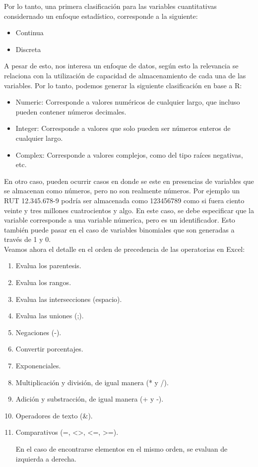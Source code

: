 \documentclass[12 pt,letterpaper]{article}
\begin{document}
Por lo tanto, una primera clasificación para las variables cuantitativas considernado un enfoque estadístico, corresponde a la siguiente: 

\begin{itemize}
	\item Continua
	\item Discreta
\end{itemize}

A pesar de esto, nos interesa un enfoque de datos, según esto la relevancia se relaciona con la utilización de capacidad de almacenamiento de cada una de las variables. Por lo tanto, podemos generar la siguiente clasificación en base a R: 

\begin{itemize}
	\item Numeric: Corresponde a valores numéricos de cualquier largo, que incluso pueden contener números decimales. 
	\item Integer: Corresponde a valores que solo pueden ser números enteros de cualquier largo. 
	\item Complex: Corresponde a valores complejos, como del tipo raíces negativas, etc. 
\end{itemize}

En otro caso, pueden ocurrir casos en donde se este en presencias de variables que se almacenan como números, pero no son realmente números. Por ejemplo un RUT 12.345.678-9 podría ser almacenada como 123456789 como si fuera ciento veinte y tres millones cuatrocientos y algo. En este caso, se debe especificar que la variable corresponde a una variable númerica, pero es un identificador. Esto también puede pasar en el caso de variables binomiales que son generadas a través de 1 y 0. \\

Veamos ahora el detalle en el orden de precedencia de las operatorias en Excel:

\begin{enumerate}
	\item Evalua los parentesis.
	\item Evalua los rangos.
	\item Evalua las intersecciones (espacio).
	\item Evalua las uniones (;).
	\item Negaciones (-).
	\item Convertir porcentajes.
	\item Exponenciales.
	\item Multiplicación y división, de igual manera (* y /).
	\item Adición y substracción, de igual manera (+ y -).
	\item Operadores de texto (\&).
	\item Comparativos (=, <>, <=, >=).
	
	En el caso de encontrarse elementos en el mismo orden, se evaluan de izquierda a derecha. 
\end{enumerate}
\end{document}
